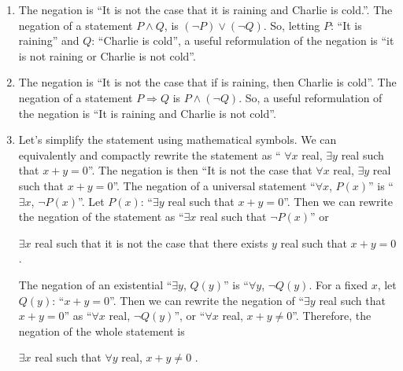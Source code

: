  \begin{problem}
 \begin{enumerate}[label=\alph*)]
 \item The negation is ``It is not the case that it is raining and Charlie is cold.''. The negation of a statement $P \wedge Q$, is $(\neg P) \vee (\neg Q)$. So, letting $P$: ``It is raining'' and $Q$: ``Charlie is cold'', a useful reformulation of the negation is ``it is not raining or Charlie is not cold''.
 \item The negation is ``It is not the case that if is raining, then Charlie is cold''. The negation of a statement $P \Rightarrow Q$ is $P \wedge (\neg Q)$. So, a useful reformulation of the negation is ``It is raining and Charlie is not cold''.
 \item Let's simplify the statement using mathematical symbols. We can equivalently and compactly rewrite the statement as `` $\forall x$ real, $\exists y$ real such that $x + y = 0$''. The negation is then ``It is not the case that $\forall x$ real, $\exists y$ real such that $x + y = 0$''. The negation of a universal statement ``$\forall x$, $P (x)$'' is ``$\exists x$, $\neg P(x)$''. Let $P (x)$: ``$\exists y$ real such that $x + y = 0$''. Then we can rewrite the negation of the statement as ``$\exists x$ real such that $\neg P (x)$'' or
 	\begin{center}
 	$\exists x$ real such that it is not the case that there exists $y$ real such that $x + y = 0$.
 	\end{center}
 The negation of an existential ``$\exists y$, $Q(y)$'' is ``$\forall y$, $\neg Q(y)$. For a fixed $x$, let $Q (y)$: ``$x + y = 0$''. Then we can rewrite the negation of ``$\exists y$ real such that $x + y = 0$'' as ``$\forall x$ real, $\neg Q (y)$'', or ``$\forall x$ real, $x + y \neq 0$''. Therefore, the negation of the whole statement is
 	\begin{center}
 	$\exists x$ real such that $\forall y$ real, $x + y \neq 0$ .
 	\end{center}
\end{enumerate}
 \end{problem}

